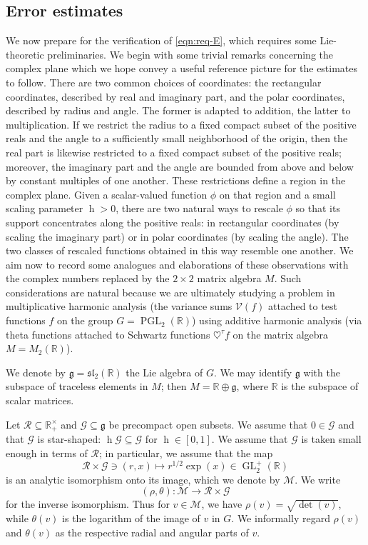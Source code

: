 \documentclass[reqno,10pt]{amsart}
\theoremstyle{plain} %
\theoremstyle{definition}
\theoremstyle{plain} %
\theoremstyle{remark}
\theoremstyle{itplain} %
\theoremstyle{remark} %
\numberwithin{equation}{section}
\DeclareMathOperator{\GL}{GL}
\def\slLie{\mathfrak{s}\mathfrak{l}}
\def\PGL{\operatorname{PGL}}
\DeclareMathOperator{\h}{h}
\begin{document}
\subsection{Error estimates}
\label{sec:org543f416}
We now prepare for the verification of \eqref{eqn:req-E}, which requires some Lie-theoretic preliminaries\label{sec:error-lie-prelim}.  We begin with some trivial remarks concerning the complex plane which we hope convey a useful reference picture for the estimates to follow.  There are two common choices of coordinates: the rectangular coordinates, described by real and imaginary part, and the polar coordinates, described by radius and angle.  The former is adapted to addition, the latter to multiplication.  If we restrict the radius to a fixed compact subset of the positive reals and the angle to a sufficiently small neighborhood of the origin, then the real part is likewise restricted to a fixed compact subset of the positive reals; moreover, the imaginary part and the angle are bounded from above and below by constant multiples of one another.  These restrictions define a region in the complex plane.  Given a scalar-valued function $\phi$ on that region and a small scaling parameter $\h > 0$, there are two natural ways to rescale $\phi$ so that its support concentrates along the positive reals: in rectangular coordinates (by scaling the imaginary part) or in polar coordinates (by scaling the angle).  The two classes of rescaled functions obtained in this way resemble one another.  We aim now to record some analogues and elaborations of these observations with the complex numbers replaced by the $2 \times 2$ matrix algebra $M$.  Such considerations are natural because we are ultimately studying a problem in multiplicative harmonic analysis (the variance sums $\mathcal{V}(f)$ attached to test functions $f$ on the group $G = \PGL_2(\mathbb{R})$) using additive harmonic analysis (via theta functions attached to Schwartz functions $\heartsuit^{\tau} f$ on the matrix algebra $M = M_2(\mathbb{R})$).

We denote by $\mathfrak{g} = \slLie_2(\mathbb{R})$ the Lie algebra of $G$.  We may identify $\mathfrak{g}$ with the subspace of traceless elements in $M$; then $M = \mathbb{R} \oplus \mathfrak{g}$, where $\mathbb{R}$ is the subspace of scalar matrices.

Let $\mathcal{R} \subseteq \mathbb{R}^\times_+$ and $\mathcal{G} \subseteq \mathfrak{g}$ be precompact open subsets.  We assume that $0 \in \mathcal{G}$ and that $\mathcal{G}$ is star-shaped: $\h \mathcal{G} \subseteq \mathcal{G}$ for $\h \in [0,1]$.  We assume that $\mathcal{G}$ is taken small enough in terms of $\mathcal{R}$; in particular, we assume that the map
\[
  \mathcal{R} \times \mathcal{G} \ni (r,x) \mapsto r^{1/2} \exp(x) \in \GL_2^+(\mathbb{R})
\]
is an analytic isomorphism onto its image, which we denote by $\mathcal{M}$.  We write
\[
  (\rho,\theta) : \mathcal{M} \rightarrow \mathcal{R} \times \mathcal{G}
\]
for the inverse isomorphism.  Thus for $v \in \mathcal{M}$, we have $\rho(v) = \sqrt{\det(v)}$, while $\theta(v)$ is the logarithm of the image of $v$ in $G$.  We informally regard $\rho(v)$ and $\theta(v)$ as the respective radial and angular parts of $v$.
\end{document}
